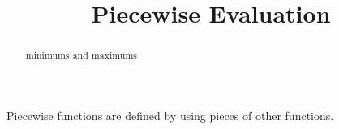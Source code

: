 \documentclass{ximera}
\title{Piecewise Evaluation}
\begin{document}
\begin{abstract}
minimums and maximums
\end{abstract}
\maketitle



Piecewise functions are defined by using pieces of other functions.
\end{document}
